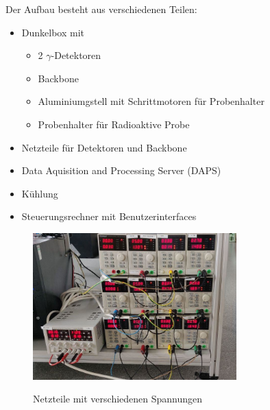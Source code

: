 \documentclass[12pt,twoside,a4paper]{scrartcl}
\begin{document}
	Der Aufbau besteht aus verschiedenen Teilen:
	\begin{itemize}
		\item Dunkelbox mit
		\begin{itemize}
			\item 2 $\gamma$-Detektoren
			\item Backbone
			\item Aluminiumgstell mit Schrittmotoren für Probenhalter
			\item Probenhalter für Radioaktive Probe
		\end{itemize}
		\item Netzteile für Detektoren und Backbone
		\item Data Aquisition and Processing Server (DAPS)
		\item Kühlung
		\item Steuerungsrechner mit Benutzerinterfaces
	\end{itemize}

	\begin{figure}[H]
		\centering
		\includegraphics[width = 0.7\textwidth]{Pictures/Netzteile.jpg}
		\label{Aufbau::Netzteile}
		\caption{Netzteile mit verschiedenen Spannungen}

	\end{figure}
\end{document}
